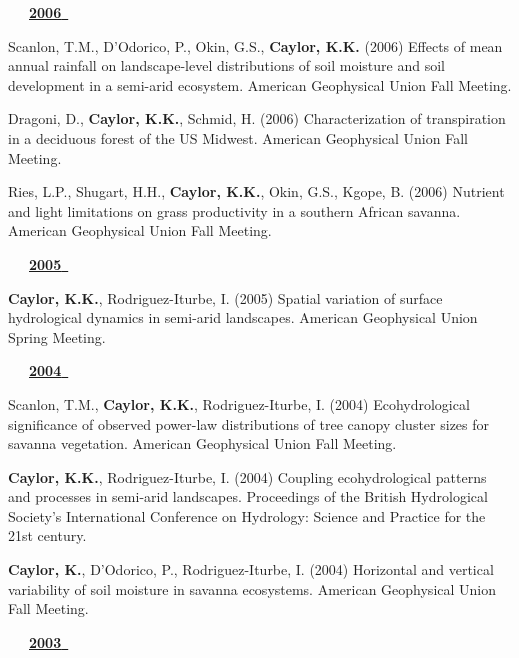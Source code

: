 \begin{etaremune}
\vspace{0.1in}
\mbox{\ \ \ \underline{\textbf{2006 }}}
\vspace{0.1in}

\item Scanlon, T.M., D'Odorico, P., Okin, G.S., \textbf{ Caylor, K.K.} (2006) Effects of mean annual rainfall on landscape-level distributions of soil moisture and soil development in a semi-arid ecosystem. American Geophysical Union Fall Meeting.
\item Dragoni, D., \textbf{ Caylor, K.K.}, Schmid, H. (2006) Characterization of transpiration in a deciduous forest of the US Midwest. American Geophysical Union Fall Meeting.
\item Ries, L.P., Shugart, H.H., \textbf{ Caylor, K.K.}, Okin, G.S., Kgope, B. (2006) Nutrient and light limitations on grass productivity in a southern African savanna. American Geophysical Union Fall Meeting.

\vspace{0.1in}
\mbox{\ \ \ \underline{\textbf{2005 }}}
\vspace{0.1in}

\item \textbf{ Caylor, K.K.}, Rodriguez-Iturbe, I. (2005) Spatial variation of surface hydrological dynamics in semi-arid landscapes. American Geophysical Union Spring Meeting.

\vspace{0.1in}
\mbox{\ \ \ \underline{\textbf{2004 }}}
\vspace{0.1in}

\item Scanlon, T.M., \textbf{ Caylor, K.K.}, Rodriguez-Iturbe, I. (2004) Ecohydrological significance of observed power-law distributions of tree canopy cluster sizes for savanna vegetation. American Geophysical Union Fall Meeting.
\item \textbf{ Caylor, K.K.}, Rodriguez-Iturbe, I. (2004) Coupling ecohydrological patterns and processes in semi-arid landscapes. Proceedings of the British Hydrological Society's International Conference on Hydrology: Science and Practice for the 21st century.
\item \textbf{ Caylor, K.}, D'Odorico, P., Rodriguez-Iturbe, I. (2004) Horizontal and vertical variability of soil moisture in savanna ecosystems. American Geophysical Union Fall Meeting.

\vspace{0.1in}
\mbox{\ \ \ \underline{\textbf{2003 }}}
\vspace{0.1in}


\end{etaremune}
